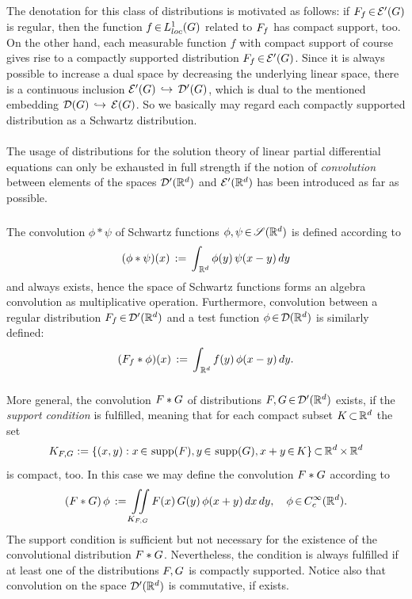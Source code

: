 \documentclass[11pt,twoside]{article}
\def\G{G}
\begin{document}
\subparagraph{}
The denotation for this class of distributions is motivated as follows:
if $\disF_f \xeof \E'(\G)$ is regular,
then the function $f \xeof \Lc$ related to $F_f$
has compact support, too.
On the other hand,
each measurable function $f$ with compact support of course
gives rise to a compactly supported distribution $\disF_f \xeof \E'(\G)$.
Since it is always possible to increase a dual space
by decreasing the underlying linear space,
there is a continuous inclusion $\E'(\G) \, \hookrightarrow \, \D'(\G)$,
which is dual to the mentioned embedding
$\D(\G) \, \hookrightarrow \, \E(\G)$.
So we basically may regard
each compactly supported distribution as a Schwartz distribution.

\paragraph{} %
The usage of distributions for the solution theory of linear partial
differential equations can only be exhausted in full strength
if the notion of \textit{convolution} between elements
of the spaces ${\mathcal{D}}'({\mathbb{R}}^d)$ and ${\mathcal{E}}'({\mathbb{R}}^d)$ has been introduced
as far as possible.

\subparagraph{}
The convolution $\phi \ast \psi$ of Schwartz functions $\phi, \psi {\,\in\,} \mathscr{S}({\mathbb{R}}^d)$
is defined according to
\[
(\phi \ast \psi) (x) \, := \, \int_{\,{\mathbb{R}}^d} \phi(y) \, \psi(x-y) \, dy
\]
and always exists,
hence the space of Schwartz functions forms an algebra
{\wrt} convolution as multiplicative operation.
Furthermore,
convolution between a regular distribution
$F_f {\,\in\,} {\mathcal{D}}'({\mathbb{R}}^d)$ and a test function $\phi {\,\in\,} {\mathcal{D}}({\mathbb{R}}^d)$
is similarly defined:
\[
(F_f \ast \phi) (x) \, := \, \int_{\,{\mathbb{R}}^d} f(y) \, \phi(x-y) \, dy.
\]

\subparagraph{}
More general,
the convolution $F * G$ of distributions
$F, G {\,\in\,} {\mathcal{D}}'({\mathbb{R}}^d)$ exists,
if the \textit{support condition} is fulfilled,
meaning that for each compact subset $K {\,\subset\,} {\mathbb{R}}^d$ the set
\[
K_{F,G} :=
\{(x,y): x {\,\in\,} \operatorname{supp}(F), y {\,\in\,} \operatorname{supp}(G), x+y {\,\in\,} K \}
{\,\subset\,} {\mathbb{R}}^d {\,\times\,} {\mathbb{R}}^d
\]
is compact, too.
In this case we may define the convolution $F \ast G$ according to
\[
(F \ast G) \, \phi \, := \,
\iint \limits_{{K}_{F,G}}
F(x)\,G(y)\,\phi(x+y) \, dx \, dy, \quad \phi {\,\in\,} C_c^{\infty}({\mathbb{R}}^d).
\]
The support condition is sufficient
but not necessary for the existence of the convolutional distribution
$F \ast G$.
Nevertheless,
the condition is always fulfilled
if at least one of the distributions $F, G$
is compactly supported.
Notice also that
convolution on the space ${\mathcal{D}}'({\mathbb{R}}^d)$ is commutative, if exists.
\end{document}
